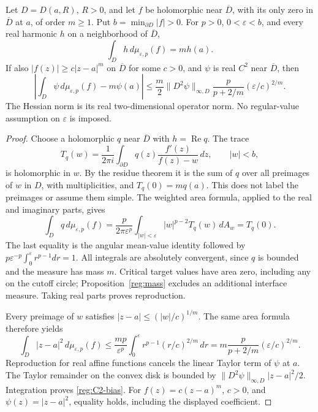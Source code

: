 \begin{proposition}
\label{reg:harmonic-bias}
Let $D=D(a,R)$, $R>0$, and let $f$ be holomorphic near $\overline D$, with
its only zero in $\overline D$ at $a$, of order $m\ge1$. Put
$b=\min_{\partial D}|f|>0$. For $p>0$, $0<\varepsilon<b$, and every
real harmonic $h$ on a neighborhood of $\overline D$,
\begin{equation}\label{reg:harmonic-reproduction}
 \int_D h\,d\mu_{\varepsilon,p}(f)=m h(a).
\end{equation}
If also $|f(z)|\ge c|z-a|^m$ on $\overline D$ for some $c>0$, and $\psi$ is real
$C^2$ near $\overline D$, then
\begin{equation}\label{reg:C2-bias}
 \left|\int_D\psi\,d\mu_{\varepsilon,p}(f)-m\psi(a)\right|
 \le \frac m2\|D^2\psi\|_{\infty,D}
       \frac{p}{p+2/m}(\varepsilon/c)^{2/m}.
\end{equation}
The Hessian norm is its real two-dimensional operator norm. No
regular-value assumption on $\varepsilon$ is imposed.
\end{proposition}
\begin{proof}
Choose a holomorphic $q$ near $\overline D$ with $h=\operatorname{Re}q$.
The trace
\[
 T_q(w)=\frac1{2\pi i}\int_{\partial D}
                 q(z)\frac{f'(z)}{f(z)-w}\,dz,\qquad |w|<b,
\]
is holomorphic in $w$. By the residue theorem it is the sum of $q$
over all preimages of $w$ in $D$, with multiplicities, and
$T_q(0)=m q(a)$. This does not label the preimages or assume them simple.
The weighted area formula, applied to the real and imaginary parts,
gives
\[
 \int_D q\,d\mu_{\varepsilon,p}(f)
 =\frac{p}{2\pi\varepsilon^p}
   \int_{|w|<\varepsilon}|w|^{p-2}T_q(w)\,dA_w=T_q(0).
\]
The last equality is the angular mean-value identity followed by
$p\varepsilon^{-p}\int_0^\varepsilon r^{p-1}dr=1$.
All integrals are absolutely convergent, since $q$ is bounded and the
measure has mass $m$. Critical target values have area zero, including
any on the cutoff circle; Proposition~\ref{reg:mass} excludes an
additional interface measure. Taking real parts proves reproduction.

Every preimage of $w$ satisfies $|z-a|\le(|w|/c)^{1/m}$. The same
area formula therefore yields
\begin{equation}\label{reg:second-moment}
 \int_D|z-a|^2\,d\mu_{\varepsilon,p}(f)
 \le\frac{mp}{\varepsilon^p}
       \int_0^\varepsilon r^{p-1}(r/c)^{2/m}\,dr
 =m\frac p{p+2/m}(\varepsilon/c)^{2/m}.
\end{equation}
Reproduction for real affine functions cancels the linear Taylor term
of $\psi$ at $a$. The Taylor remainder on the convex disk is bounded
by $\|D^2\psi\|_{\infty,D}|z-a|^2/2$. Integration proves
\eqref{reg:C2-bias}. For $f(z)=c(z-a)^m$, $c>0$, and
$\psi(z)=|z-a|^2$, equality holds, including the displayed coefficient.
\end{proof}

